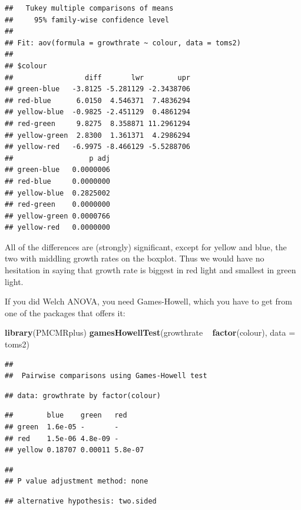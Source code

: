 \documentclass[]{tufte-book}
\newenvironment{Shaded}{}{}
\newcommand{\DataTypeTok}[1]{\textcolor[rgb]{0.56,0.13,0.00}{#1}}
\newcommand{\KeywordTok}[1]{\textcolor[rgb]{0.00,0.44,0.13}{\textbf{#1}}}
\newcommand{\NormalTok}[1]{#1}
\newcommand{\OperatorTok}[1]{\textcolor[rgb]{0.40,0.40,0.40}{#1}}
\newcommand{\StringTok}[1]{\textcolor[rgb]{0.25,0.44,0.63}{#1}}
\theoremstyle{definition}
\theoremstyle{definition}
\theoremstyle{definition}
\theoremstyle{remark}
\begin{document}
\begin{verbatim}
##   Tukey multiple comparisons of means
##     95% family-wise confidence level
## 
## Fit: aov(formula = growthrate ~ colour, data = toms2)
## 
## $colour
##                 diff       lwr        upr
## green-blue   -3.8125 -5.281129 -2.3438706
## red-blue      6.0150  4.546371  7.4836294
## yellow-blue  -0.9825 -2.451129  0.4861294
## red-green     9.8275  8.358871 11.2961294
## yellow-green  2.8300  1.361371  4.2986294
## yellow-red   -6.9975 -8.466129 -5.5288706
##                  p adj
## green-blue   0.0000006
## red-blue     0.0000000
## yellow-blue  0.2825002
## red-green    0.0000000
## yellow-green 0.0000766
## yellow-red   0.0000000
\end{verbatim}

All of the differences are (strongly) significant, except for yellow and
blue, the two with middling growth rates on the boxplot. Thus we would
have no hesitation in saying that growth rate is biggest in red light
and smallest in green light.

If you did Welch ANOVA, you need Games-Howell, which you have to get
from one of the packages that offers it:

\begin{Shaded}
\begin{Highlighting}[]
\KeywordTok{library}\NormalTok{(PMCMRplus)}
\KeywordTok{gamesHowellTest}\NormalTok{(growthrate }\OperatorTok{~}\StringTok{ }\KeywordTok{factor}\NormalTok{(colour), }\DataTypeTok{data =}\NormalTok{ toms2)}
\end{Highlighting}
\end{Shaded}

\begin{verbatim}
## 
##  Pairwise comparisons using Games-Howell test
\end{verbatim}

\begin{verbatim}
## data: growthrate by factor(colour)
\end{verbatim}

\begin{verbatim}
##        blue    green   red    
## green  1.6e-05 -       -      
## red    1.5e-06 4.8e-09 -      
## yellow 0.18707 0.00011 5.8e-07
\end{verbatim}

\begin{verbatim}
## 
## P value adjustment method: none
\end{verbatim}

\begin{verbatim}
## alternative hypothesis: two.sided
\end{verbatim}
\end{document}
